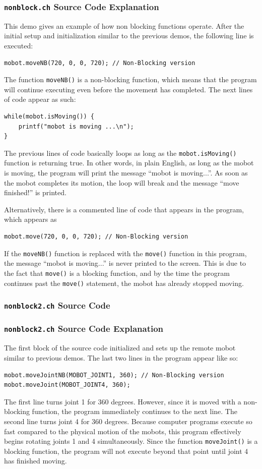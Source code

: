 \documentclass{article}
\begin{document}
\subsubsection{\texttt{nonblock.ch} Source Code Explanation}
This demo gives an example of how non blocking functions operate. 
After the initial setup and initialization similar to the previous
demos, the following line is executed:
\begin{verbatim}
mobot.moveNB(720, 0, 0, 720); // Non-Blocking version
\end{verbatim}
The function \texttt{moveNB()} is a non-blocking function, which means
that the program will continue executing even before the movement
has completed. The next lines of code appear as such:
\begin{verbatim}
while(mobot.isMoving()) {
    printf("mobot is moving ...\n");
}
\end{verbatim}
The previous lines of code basically loops as long as the \texttt{mobot.isMoving()} function
is returning true. In other words, in plain English, as long as the mobot is moving,
the program will print the message ``mobot is moving...''. As soon as the mobot completes
its motion, the loop will break and the message ``move finished!'' is printed.

Alternatively, there is a commented line of code that appears in the program, which
appears as
\begin{verbatim}
mobot.move(720, 0, 0, 720); // Non-Blocking version
\end{verbatim}
If the \texttt{moveNB()} function is replaced with the \texttt{move()} function in this program,
the message ``mobot is moving...'' is never printed to the screen. This is due to the
fact that \texttt{move()} is a blocking function, and by the time the program continues past
the \texttt{move()} statement, the mobot has already stopped moving.

\subsubsection{\texttt{nonblock2.ch} Source Code}

\subsubsection{\texttt{nonblock2.ch} Source Code Explanation}
The first block of the source code initialized and sets up the remote mobot 
similar to previous demos. The last two lines in the program appear like so:
\begin{verbatim}
mobot.moveJointNB(MOBOT_JOINT1, 360); // Non-Blocking version
mobot.moveJoint(MOBOT_JOINT4, 360);
\end{verbatim}
The first line turns joint 1 for 360 degrees. However, since it is moved with a non-blocking function,
the program immediately continues to the next line. The second line turns joint 4 for
360 degrees. Because computer programs execute so fast compared to the physical
motion of the mobots, this program effectively begins rotating joints 1 and 4 
simultaneously. Since the function \texttt{moveJoint()} is a blocking function,
the program will not execute beyond that point until joint 4 has finished moving.
\end{document}
